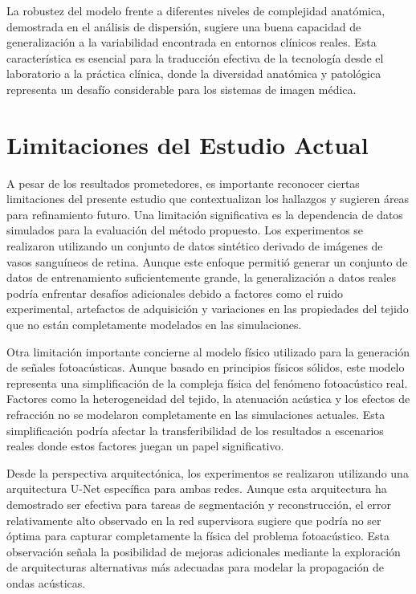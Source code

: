 La robustez del modelo frente a diferentes niveles de complejidad anatómica, demostrada en el análisis de dispersión, sugiere una buena capacidad de generalización a la variabilidad encontrada en entornos clínicos reales. Esta característica es esencial para la traducción efectiva de la tecnología desde el laboratorio a la práctica clínica, donde la diversidad anatómica y patológica representa un desafío considerable para los sistemas de imagen médica.

\section{Limitaciones del Estudio Actual}

A pesar de los resultados prometedores, es importante reconocer ciertas limitaciones del presente estudio que contextualizan los hallazgos y sugieren áreas para refinamiento futuro. Una limitación significativa es la dependencia de datos simulados para la evaluación del método propuesto. Los experimentos se realizaron utilizando un conjunto de datos sintético derivado de imágenes de vasos sanguíneos de retina. Aunque este enfoque permitió generar un conjunto de datos de entrenamiento suficientemente grande, la generalización a datos reales podría enfrentar desafíos adicionales debido a factores como el ruido experimental, artefactos de adquisición y variaciones en las propiedades del tejido que no están completamente modelados en las simulaciones.

Otra limitación importante concierne al modelo físico utilizado para la generación de señales fotoacústicas. Aunque basado en principios físicos sólidos, este modelo representa una simplificación de la compleja física del fenómeno fotoacústico real. Factores como la heterogeneidad del tejido, la atenuación acústica y los efectos de refracción no se modelaron completamente en las simulaciones actuales. Esta simplificación podría afectar la transferibilidad de los resultados a escenarios reales donde estos factores juegan un papel significativo.

Desde la perspectiva arquitectónica, los experimentos se realizaron utilizando una arquitectura U-Net específica para ambas redes. Aunque esta arquitectura ha demostrado ser efectiva para tareas de segmentación y reconstrucción, el error relativamente alto observado en la red supervisora sugiere que podría no ser óptima para capturar completamente la física del problema fotoacústico. Esta observación señala la posibilidad de mejoras adicionales mediante la exploración de arquitecturas alternativas más adecuadas para modelar la propagación de ondas acústicas.

